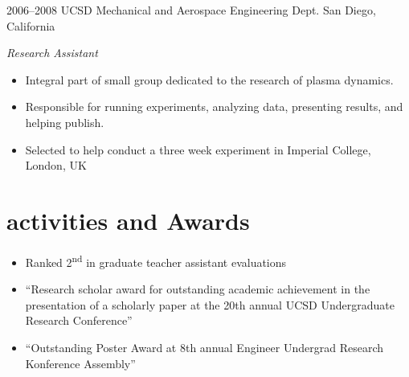 \documentclass[]{friggeri-cv} %
\begin{document}
\begin{entrylist}
\entry
{2006--2008}
{UCSD Mechanical and Aerospace Engineering Dept.}
{San Diego, California}
{\emph{Research Assistant} \\ 
\begin{itemize}
\item Integral part of small group dedicated to the research of plasma dynamics.
\item Responsible for running experiments, analyzing data, presenting results, and helping publish.
\item Selected to help conduct a three week experiment in Imperial College, London, UK
\end{itemize}}
\end{entrylist}


\section{activities and Awards}
\begin{itemize}
\item Ranked 2\textsuperscript{nd} in graduate teacher assistant evaluations   
\item ``Research scholar award for outstanding academic achievement in the presentation of a scholarly
paper at the 20th annual UCSD Undergraduate Research Conference''
\item ``Outstanding Poster Award at 8th annual Engineer Undergrad Research Konference Assembly''
\end{itemize}

%
%
\end{document}
